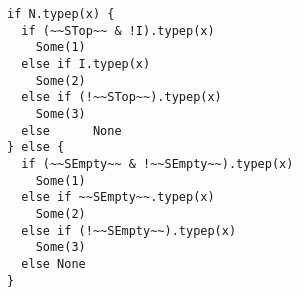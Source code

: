 \begin{lstlisting}[style=scalaioScala]
if N.typep(x) {
  if (~~STop~~ & !I).typep(x)
    Some(1)
  else if I.typep(x)
    Some(2)
  else if (!~~STop~~).typep(x)
    Some(3)
  else      None
} else {
  if (~~SEmpty~~ & !~~SEmpty~~).typep(x)
    Some(1)
  else if ~~SEmpty~~.typep(x)
    Some(2)
  else if (!~~SEmpty~~).typep(x)
    Some(3)
  else None
}
\end{lstlisting}
